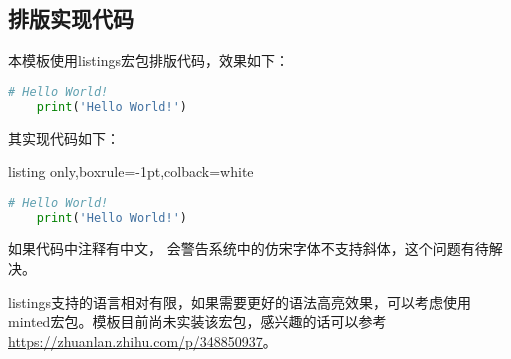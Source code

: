 \subsection{排版实现代码}

本模板使用listings宏包排版代码，效果如下：
\begin{lstlisting}[breaklines=true,language=Python]
    # Hello World!
    print('Hello World!')
\end{lstlisting}

其实现代码如下：
\begin{tcblisting}{listing only,boxrule=-1pt,colback=white}
\begin{lstlisting}[breaklines=true,language=Python]
    # Hello World!
    print('Hello World!')
\end{lstlisting}
\end{tcblisting}

如果代码中注释有中文，\XeLaTeX{} 会警告系统中的仿宋字体不支持斜体，这个问题有待解决。

listings支持的语言相对有限，如果需要更好的语法高亮效果，可以考虑使用minted宏包。模板目前尚未实装该宏包，感兴趣的话可以参考\url{https://zhuanlan.zhihu.com/p/348850937}。
